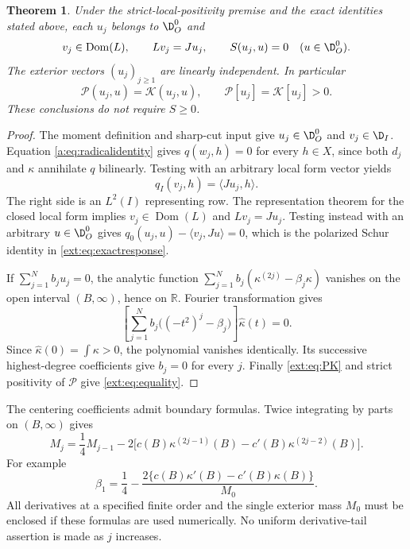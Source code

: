 \documentclass[11pt,a4paper]{article}
\numberwithin{equation}{section}
\newtheorem{theorem}{Theorem}[section]
\theoremstyle{definition}\newtheorem{definition}[theorem]{Definition}
\theoremstyle{remark}\newtheorem{remark}[theorem]{Remark}
\newcommand{\R}{\mathbb R}\newcommand{\C}{\mathbb C}\newcommand{\N}{\mathbb N}
\newcommand{\ip}[2]{\langle#1,#2\rangle}\newcommand{\norm}[1]{\lVert#1\rVert}\newcommand{\abs}[1]{\lvert#1\rvert}
\begin{document}
\begin{theorem}\label{ext:thm:null}
Under the strict-local-positivity premise and the exact identities stated above, each $u_j$ belongs to $\D_O^0$ and
\begin{equation}\label{ext:eq:exactresponse}
 v_j\in\operatorname{Dom}(L),\qquad Lv_j=Ju_j,\qquad
 S(u_j,u)=0\quad(u\in\D_O^0).
\end{equation}
The exterior vectors $(u_j)_{j\ge1}$ are linearly independent. In particular
\begin{equation}\label{ext:eq:equality}
 \mathcal P(u_j,u)=\mathcal K(u_j,u),\qquad
 \mathcal P[u_j]=\mathcal K[u_j]>0.
\end{equation}
These conclusions do not require $S\ge0$.
\end{theorem}
\begin{proof}
The moment definition and sharp-cut input give $u_j\in\D_O^0$ and $v_j\in\D_I$. Equation \eqref{a:eq:radicalidentity} gives $q(w_j,h)=0$ for every $h\in X$, since both $d_j$ and $\kappa$ annihilate $q$ bilinearly. Testing with an arbitrary local form vector yields
\[
 q_I(v_j,h)=\ip{Ju_j}{h}.
\]
The right side is an $L^2(I)$ representing row. The representation theorem for the closed local form implies $v_j\in\operatorname{Dom}(L)$ and $Lv_j=Ju_j$. Testing instead with an arbitrary $u\in\D_O^0$ gives
$q_0(u_j,u)-\ip{v_j}{Ju}=0$, which is the polarized Schur identity in \eqref{ext:eq:exactresponse}.

If $\sum_{j=1}^N b_ju_j=0$, the analytic function
$\sum_{j=1}^N b_j(\kappa^{(2j)}-\beta_j\kappa)$ vanishes on the open interval $(B,\infty)$, hence on $\R$. Fourier transformation gives
\[
 \left[\sum_{j=1}^N b_j\bigl((-t^2)^j-\beta_j\bigr)\right]\widehat\kappa(t)=0.
\]
Since $\widehat\kappa(0)=\int\kappa>0$, the polynomial vanishes identically. Its successive highest-degree coefficients give $b_j=0$ for every $j$. Finally \eqref{ext:eq:PK} and strict positivity of $\mathcal P$ give \eqref{ext:eq:equality}.
\end{proof}

The centering coefficients admit boundary formulas. Twice integrating by parts on $(B,\infty)$ gives
\begin{equation}\label{ext:eq:recurrence}
 M_j=\frac14 M_{j-1}
 -2\bigl[c(B)\kappa^{(2j-1)}(B)-c'(B)\kappa^{(2j-2)}(B)\bigr].
\end{equation}
For example
\[
 \beta_1=\frac14-
 \frac{2\{c(B)\kappa'(B)-c'(B)\kappa(B)\}}{M_0}.
\]
All derivatives at a specified finite order and the single exterior mass $M_0$ must be enclosed if these formulas are used numerically. No uniform derivative-tail assertion is made as $j$ increases.
\end{document}
